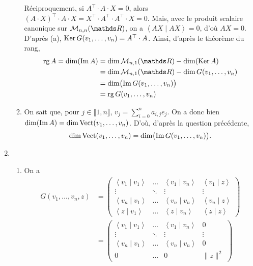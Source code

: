 \documentclass[a4paper]{article}
\begin{document}
\begin{enumerate}
\begin{enumerate}
					Réciproquement, si $A^\top \cdot A \cdot X = 0$, alors $(A\cdot X)^\top \cdot A\cdot X = X^\top \cdot A^\top \cdot A^\top \cdot X = 0$.
					Mais, avec le produit scalaire canonique sur $\mathcal{M}_{n,n}(\R)$, on a $\left<AX \mid AX \right> = 0$, d'où $AX = 0$.
					D'après (a), $\operatorname{Ker} G(v_1, \ldots, v_n) = A^\top \cdot A$. Ainsi, d'après le théorème du rang,
					\begin{align*}
						\rg A = \dim(\Im A) &= \dim \mathcal{M}_{n,1}(\R) - \dim(\Ker A)\\
						&= \dim \mathcal{M}_{n,1}(\R) - \dim G(v_1, \ldots, v_n)\\
						&= \dim\!\big(\!\Im G(v_1, \ldots, v_n)\big)\\
						&= \rg G(v_1, \ldots, v_n)
					\end{align*}
				\item On sait que, pour $j \in \llbracket 1,n \rrbracket$, $v_j = \sum_{i=0}^n a_{i,j} e_j$. On a donc bien $\dim (\operatorname{Im} A) = \dim \operatorname{Vect}(v_1, \ldots, v_n)$. D'où, d'après la question précédente, \[
					\dim \operatorname{Vect}(v_1, \ldots, v_n) = \dim\!\big(\!\operatorname{Im} G(v_1, \ldots, v_n)\big)
				.\]
			\end{enumerate}
		\item
			\begin{enumerate}
				\item On a
					\begin{align*}
						G(v_1, \ldots, v_n, z) &= \begin{pmatrix}
							\left<v_1 \mid v_1 \right> & \ldots & \left<v_1 \mid v_n \right> & \left<v_1 \mid z \right>\\
							\vdots & \ddots & \vdots & \vdots\\
							\left<v_n  \mid v_1 \right> & \ldots & \left<v_n  \mid v_n \right> & \left<v_n  \mid z \right>\\
							\left<z  \mid v_1 \right> & \ldots & \left<z  \mid v_n \right> & \left<z  \mid z \right>
						\end{pmatrix}\\
						&= \begin{pmatrix}
							\left<v_1 \mid v_1 \right> & \ldots & \left<v_1 \mid v_n \right> & 0\\
							\vdots & \ddots & \vdots & \vdots\\
							\left<v_n  \mid v_1 \right> & \ldots & \left<v_n  \mid v_n \right> & 0 \\
							0 & \ldots & 0 & \|z\|^2
						\end{pmatrix} \\

\end{align*}
\end{enumerate}
\end{enumerate}
\end{document}
